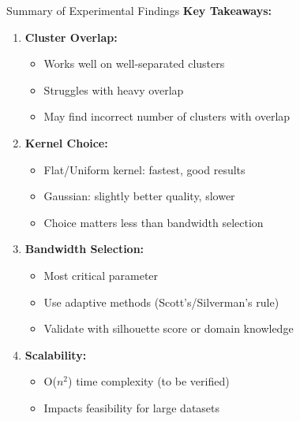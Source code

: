 \begin{frame}{Summary of Experimental Findings}
    \textbf{Key Takeaways:}

    \vspace{0.3cm}

    \begin{enumerate}
        \item \textbf{Cluster Overlap:}
        \begin{itemize}
            \item Works well on well-separated clusters
            \item Struggles with heavy overlap
            \item May find incorrect number of clusters with overlap
        \end{itemize}

        \vspace{0.2cm}

        \item \textbf{Kernel Choice:}
        \begin{itemize}
            \item Flat/Uniform kernel: fastest, good results
            \item Gaussian: slightly better quality, slower
            \item Choice matters less than bandwidth selection
        \end{itemize}

        \vspace{0.2cm}

        \item \textbf{Bandwidth Selection:}
        \begin{itemize}
            \item \textcolor{customred}{Most critical parameter}
            \item Use adaptive methods (Scott's/Silverman's rule)
            \item Validate with silhouette score or domain knowledge
        \end{itemize}

        \vspace{0.2cm}

        \item \textbf{Scalability:}
        \begin{itemize}
            \item O($n^2$) time complexity (to be verified)
            \item Impacts feasibility for large datasets
        \end{itemize}
    \end{enumerate}
\end{frame}
